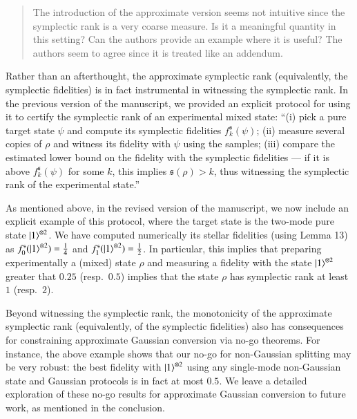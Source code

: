 \documentclass[a4paper,12pt]{article}
\newenvironment{Referee}[1]
{\noindent {\bf Comment #1:} \begin{quote} }
{\end{quote}\vspace{0 cm}}
\newenvironment{Response}
{\noindent \color{RawSienna}{\bf Response:} }
{\vspace{0.4 cm}}
\begin{document}
\begin{Referee}{8}
The introduction of the approximate version seems not intuitive since the symplectic rank is a very coarse measure. Is it a meaningful quantity in this setting? Can the authors provide an example where it is useful? The authors seem to agree since it is treated like an addendum.
\end{Referee}

\begin{Response}
    Rather than an afterthought, the approximate symplectic rank (equivalently, the symplectic fidelities) is in fact instrumental in witnessing the symplectic rank. In the previous version of the manuscript, we provided an explicit protocol for using it to certify the symplectic rank of an experimental mixed state: ``(i) pick a pure target state $\psi$ and compute its symplectic fidelities $f_k^\mathfrak s(\psi)$; (ii) measure several copies of $\rho$ and witness its fidelity with $\psi$ using the samples; (iii) compare the estimated lower bound on the fidelity with the symplectic fidelities --- if it is above $f_k^\mathfrak s(\psi)$ for some $k$, this implies $\mathfrak s(\rho)>k$, thus witnessing the symplectic rank of the experimental state.''

    As mentioned above, in the revised version of the manuscript, we now include an explicit example of this protocol, where the target state is the two-mode pure state $\ket1^{\otimes2}$. We have computed numerically its stellar fidelities (using Lemma 13) as $f^{\mathfrak s}_0(\ket1^{\otimes2})=\frac14$ and $f^{\mathfrak s}_1(\ket1^{\otimes2})=\frac12$. In particular, this implies that preparing experimentally a (mixed) state $\rho$ and measuring a fidelity with the state $\ket1^{\otimes2}$ greater that $0.25$ (resp.\ $0.5$) implies that the state $\rho$ has symplectic rank at least $1$ (resp.\ $2$).

    Beyond witnessing the symplectic rank, the monotonicity of the approximate symplectic rank (equivalently, of the symplectic fidelities) also has consequences for constraining approximate Gaussian conversion via no-go theorems. For instance, the above example shows that our no-go for non-Gaussian splitting may be very robust: the best fidelity with $\ket1^{\otimes2}$ using any single-mode non-Gaussian state and Gaussian protocols is in fact at most $0.5$. We leave a detailed exploration of these no-go results for approximate Gaussian conversion to future work, as mentioned in the conclusion.
\end{Response}
\end{document}
